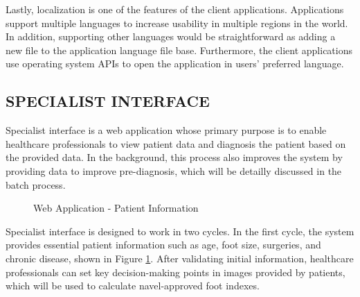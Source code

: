 Lastly, localization is one of the features of the client applications. Applications support multiple languages to increase usability in multiple regions in the world. In addition, supporting other languages would be straightforward as adding a new file to the application language file base. Furthermore, the client applications use operating system APIs to open the application in users' preferred language.

\subsection{SPECIALIST INTERFACE} \label{sec:SpecialistInterface}

Specialist interface is a web application whose primary purpose is to enable healthcare professionals to view patient data and diagnosis the patient based on the provided data. In the background, this process also improves the system by providing data to improve pre-diagnosis, which will be detailly discussed in the batch process. 

\begin{figure}[htbp]
\centering
{}
\caption{Web Application - Patient Information}
\label{fig:WebApplicationPatientInfo}
\end{figure}

Specialist interface is designed to work in two cycles. In the first cycle, the system provides essential patient information such as age, foot size, surgeries, and chronic disease, shown in Figure \ref{fig:WebApplicationPatientInfo}. After validating initial information, healthcare professionals can set key decision-making points in images provided by patients, which will be used to calculate navel-approved foot indexes. 

